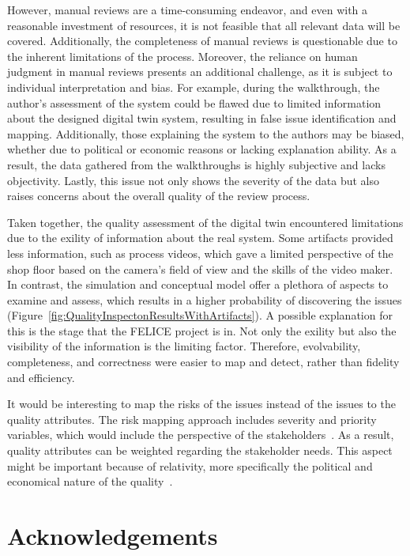 \documentclass{llncs}
\begin{document}
    However, manual reviews are a time-consuming endeavor, and even with a reasonable investment of resources, it is not feasible that all relevant data will be covered. 
    Additionally, the completeness of manual reviews is questionable due to the inherent limitations of the process. 
    Moreover, the reliance on human judgment in manual reviews presents an additional challenge, as it is subject to individual interpretation and bias.  
    For example, during the walkthrough, the author's assessment of the system could be flawed due to limited information about the designed digital twin system, resulting in false 
    issue identification and mapping. Additionally, those explaining the system to the authors may be biased, 
    whether due to political or economic reasons or lacking explanation ability. As a result, the data gathered from the walkthroughs is highly subjective and lacks objectivity. Lastly, this issue not only shows the severity of the data but also raises concerns about 
    the overall quality of the review process.

    Taken together, the quality assessment of the digital twin encountered limitations due to the exility of information about the real system. 
    Some artifacts provided less information, such as process videos, which gave a limited perspective of the shop floor based on the camera's 
    field of view and the skills of the video maker. In contrast, the simulation and conceptual model offer a plethora of aspects to examine and assess, 
    which results in a higher probability of discovering the issues (Figure~\ref{fig:QualityInspectonResultsWithArtifacts}). 
    A possible explanation for this is the stage that the FELICE project is in. Not only the exility but also the visibility of the information is the limiting factor. 
    Therefore, evolvability, completeness, and correctness were easier to map and detect, rather than fidelity and efficiency. 

    It would be interesting to map the risks of the issues instead of the issues to the quality attributes. 
    The risk mapping approach includes severity and priority variables, which would include the perspective of the stakeholders~\cite{CemKanerSoftwareTesting, ISO/IEC/IEEE29119}.
    As a result, quality attributes can be weighted regarding the stakeholder needs.  This aspect might be important because of relativity, 
    more specifically the political and economical nature of the quality~\cite{SystemQuality}. 

   
    \section*{Acknowledgements}

    
    
\end{document}
